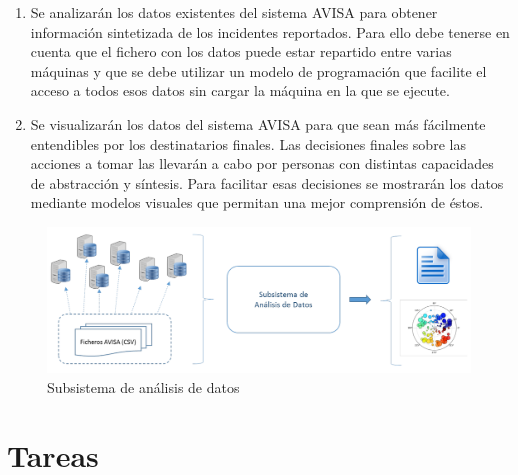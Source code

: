 \documentclass[
  a4paper,
]{scrreport}
\begin{document}
\begin{enumerate}
\def\labelenumi{\arabic{enumi}.}
\item
  Se analizarán los datos existentes del sistema AVISA para obtener
  información sintetizada de los incidentes reportados. Para ello debe
  tenerse en cuenta que el fichero con los datos puede estar repartido
  entre varias máquinas y que se debe utilizar un modelo de programación
  que facilite el acceso a todos esos datos sin cargar la máquina en la
  que se ejecute.
\item
  Se visualizarán los datos del sistema AVISA para que sean más
  fácilmente entendibles por los destinatarios finales. Las decisiones
  finales sobre las acciones a tomar las llevarán a cabo por personas
  con distintas capacidades de abstracción y síntesis. Para facilitar
  esas decisiones se mostrarán los datos mediante modelos visuales que
  permitan una mejor comprensión de éstos.
\end{enumerate}

\begin{figure}

{\centering \includegraphics{./img/convive/subsistema-analisis-datos.png}

}

\caption{Subsistema de análisis de datos}

\end{figure}

\hypertarget{tareas-2}{%
\section{Tareas}\label{tareas-2}}
\end{document}
